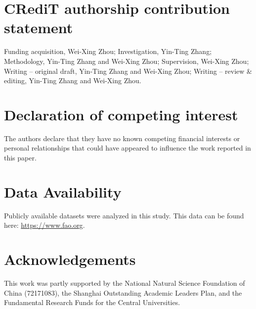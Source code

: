 \documentclass[preprint,3p,times,sort&compress]{elsarticle}
\begin{document}


\section*{CRediT authorship contribution statement}

Funding acquisition, Wei-Xing Zhou; Investigation, Yin-Ting Zhang; Methodology, Yin-Ting Zhang and Wei-Xing Zhou; Supervision, Wei-Xing Zhou; Writing – original draft, Yin-Ting Zhang and Wei-Xing Zhou; Writing – review \& editing, Yin-Ting Zhang and Wei-Xing Zhou.

\section*{Declaration of competing interest}

The authors declare that they have no known competing financial interests or personal relationships that could have appeared to
influence the work reported in this paper.

\section*{Data Availability}
Publicly available datasets were analyzed in this study. This data can be found here: \href{https://www.fao.org}{ https://www.fao.org}.

\section*{Acknowledgements}
\label{S6:Acknowledgements}


This work was partly supported by the National Natural Science Foundation of China (72171083), the Shanghai Outstanding Academic Leaders Plan, and the Fundamental Research Funds for the Central Universities.
\end{document}

